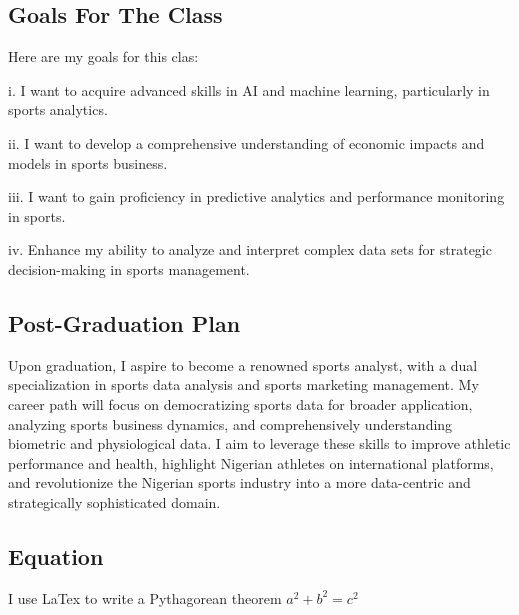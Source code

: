 \documentclass[10pt]{article}
\begin{document}
\subsection{Goals For The Class}
Here are my goals for this clas:

i. I want to acquire advanced skills in AI and machine learning, particularly in sports analytics.

ii. I want to develop a comprehensive understanding of economic impacts and models in sports business.

iii. I want to gain proficiency in predictive analytics and performance monitoring in sports.

iv. Enhance my ability to analyze and interpret complex data sets for strategic decision-making in sports management.

\subsection{Post-Graduation Plan}
Upon graduation, I aspire to become a renowned sports analyst, with a dual specialization in sports data analysis and sports marketing management. My career path will focus on democratizing sports data for broader application, analyzing sports business dynamics, and comprehensively understanding biometric and physiological data. I aim to leverage these skills to improve athletic performance and health, highlight Nigerian athletes on international platforms, and revolutionize the Nigerian sports industry into a more data-centric and strategically sophisticated domain.


\subsection{Equation}
I use LaTex  to write a Pythagorean theorem \(a^2 + b^2 = c^2\)  
\end{document}
